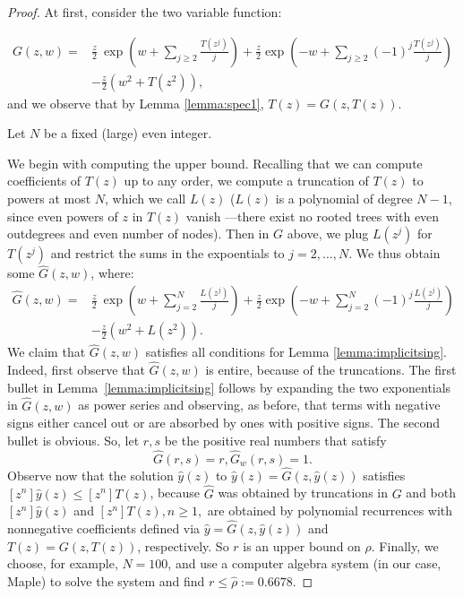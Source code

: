 \documentclass[10pt,a4paper]{amsart}
\newcommand{\UG}{\hat{G}}
\newcommand{\nicetrees}{T}
\begin{document}
\begin{proof}


At first, consider the two variable function:

\begin{align}\label{eq:G}
\nonumber G(z,w) =   &\frac{z}{2} 
\ \exp\left( w + \sum\limits_{j \geq 2} \frac{\nicetrees(z^j)}{j}\right) 
+ \frac{z}{2}\exp\left(-w + \sum\limits_{j \geq 2} (-1)^j \frac{\nicetrees(z^j)}{j}\right) \\ &
- \frac{z}{2}\left({w^2}
+ {\nicetrees(z^2)} \right),
\end{align}
and we observe that by Lemma \ref{lemma:spec1}, $T(z) = G(z,T(z))$.

Let $N$ be a fixed (large) even integer.

We begin with computing the upper bound.   Recalling that we can compute coefficients of $T(z)$ up to any order, we compute a truncation of $T(z)$ to powers at most  $N$, which we call $L(z)$ ($L(z)$ is a polynomial of degree $N-1$, since even powers of $z$ in $T(z)$ vanish ---there exist no rooted trees with even outdegrees and even number of nodes). Then in $G$ above, we plug  $L(z^j)$ for $T(z^j)$  and restrict the sums in the expoentials to $j=2, \ldots, N$. We thus obtain some  $\UG(z,w)$, where:
\begin{align}\label{eq:UG}
\nonumber \UG(z,w) =   &\frac{z}{2} 
\ \exp\left( w + \sum\limits_{j =2}^{N} \frac{L(z^j)}{j}\right) 
+ \frac{z}{2}\exp\left(-w + \sum\limits_{j =2}^{N} (-1)^j \frac{L(z^j)}{j}\right) \\ &
- \frac{z}{2}\left({w^2}
+ {L(z^2)} \right).
\end{align}
We claim that $\UG(z,w)$ satisfies  all conditions for Lemma \ref{lemma:implicitsing}.  Indeed, first  observe that 
$\UG(z,w)$  is  entire,  because of the truncations. The first bullet in Lemma~\ref{lemma:implicitsing} follows by expanding the two exponentials in $\UG(z,w)$ as power series and observing, as before,  that terms with negative signs either cancel out or are absorbed  by ones with positive signs. The second  bullet  is obvious.  So, let $r,s$ be the positive real numbers that satisfy 
$$\UG(r,s)=r,\UG_w(r,s)=1.$$
 Observe now that  the solution $\hat{y}(z)$ to $\hat{y}(z) = \UG(z,\hat{y}(z))$
satisfies $[z^n] \hat{y}(z) \leq [z^n] \nicetrees(z)$, because  $\UG$ was obtained by truncations in $G$ and both  $[z^n] \hat{y}(z)$ and  $[z^n] \nicetrees(z), n\geq 1,$ are  obtained by polynomial recurrences with nonnegative coefficients defined via $\hat{y} = \UG(z,\hat{y}(z))$ and $T(z) = G(z, T(z))$, respectively. So $r$ is an upper bound on $\rho$. Finally, we choose, for example,  $N=100$, and  use a computer algebra system (in our case, Maple) to solve the system and find $r \leq \hat{\rho} := 0.6678$.


\end{proof}
\end{document}
